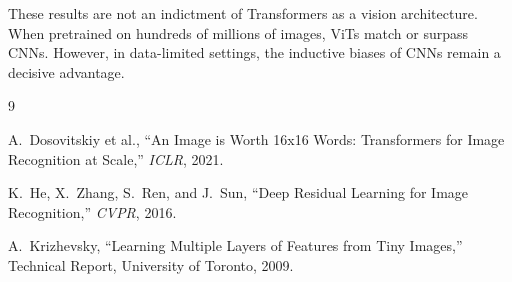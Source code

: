 \documentclass[11pt,a4paper]{article}
\begin{document}
These results are not an indictment of Transformers as a vision architecture.
When pretrained on hundreds of millions of images, ViTs match or surpass CNNs.
However, in data-limited settings, the inductive biases of CNNs remain a decisive
advantage.

\begin{thebibliography}{9}

A.~Dosovitskiy et al.,
``An Image is Worth 16x16 Words: Transformers for Image Recognition at Scale,''
\textit{ICLR}, 2021.

K.~He, X.~Zhang, S.~Ren, and J.~Sun,
``Deep Residual Learning for Image Recognition,''
\textit{CVPR}, 2016.

A.~Krizhevsky,
``Learning Multiple Layers of Features from Tiny Images,''
Technical Report, University of Toronto, 2009.

\end{thebibliography}
\end{document}
